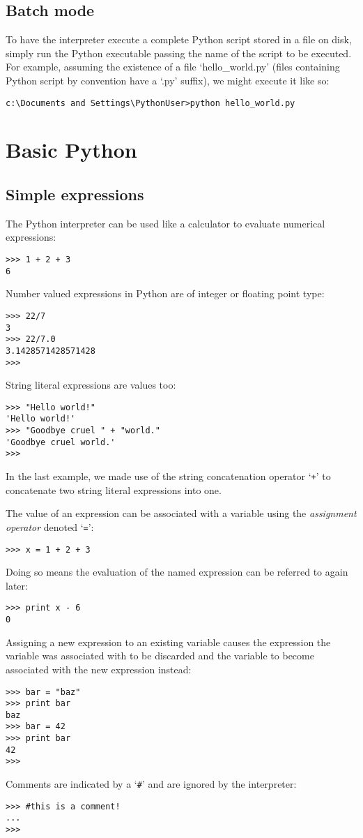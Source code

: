 \subsection{Batch mode}

To have the interpreter execute a complete Python script stored in a
file on disk, simply run the Python executable passing the name of the
script to be executed. For example, assuming the existence of a file
`hello\_world.py' (files containing Python script by convention have
a `.py' suffix), we might execute it like so:
\begin{verbatim}
c:\Documents and Settings\PythonUser>python hello_world.py
\end{verbatim}

\section{Basic Python}

\subsection{Simple expressions}

The Python interpreter can be used like a calculator to evaluate
numerical expressions:
\begin{verbatim}
>>> 1 + 2 + 3
6
\end{verbatim}
Number valued expressions in Python are of integer or floating point
type:
\begin{verbatim}
>>> 22/7
3
>>> 22/7.0
3.1428571428571428
>>> 
\end{verbatim}
String literal expressions are values too:
\begin{verbatim}
>>> "Hello world!"
'Hello world!'
>>> "Goodbye cruel " + "world."
'Goodbye cruel world.'
>>> 
\end{verbatim}
In the last example, we made use of the string concatenation operator
`\verb|+|' to concatenate two string literal expressions into one.

The value of an expression can be associated with a variable using the
\emph{assignment operator} denoted `\verb|=|':
\begin{verbatim}
>>> x = 1 + 2 + 3
\end{verbatim}
Doing so means the evaluation of the named expression can be referred
to again later:
\begin{verbatim}
>>> print x - 6
0
\end{verbatim}
Assigning a new expression to an existing variable causes the
expression the variable was associated with to be discarded and the
variable to become associated with the new expression instead:
\begin{verbatim}
>>> bar = "baz"
>>> print bar
baz
>>> bar = 42
>>> print bar
42
>>> 
\end{verbatim}
Comments are indicated by a `\verb|#|' and are ignored by the
interpreter:
\begin{verbatim}
>>> #this is a comment!
... 
>>> 
\end{verbatim}

